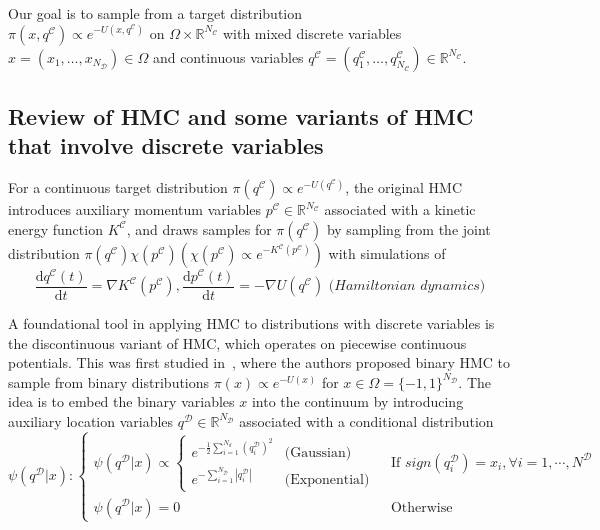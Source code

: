 \documentclass{article}
\newcommand{\cald}{\mathcal{D}}
\newcommand{\calc}{\mathcal{C}}
\begin{document}
Our goal is to sample from a target distribution $\pi (x, q^\calc)\propto e^{-U(x, q^\calc)}\text{ on }\Omega\times \mathbb{R}^{N_\calc}$ with mixed discrete variables $x = (x_1, \ldots, x_{N_\cald})\in\Omega$ and continuous variables $q^\calc=(q^\calc_1, \ldots, q^\calc_{N_\calc})\in\mathbb{R}^{N_\calc}$. 

\subsection{Review of HMC and some variants of HMC that involve discrete variables}\label{sec:related_works}

For a continuous target distribution $\pi(q^\calc)\propto e^{-U(q^\calc)}$, the original HMC introduces auxiliary momentum variables $p^\calc\in\mathbb{R}^{N_\calc}$ associated with a kinetic energy function $K^\calc$, and draws samples for $\pi(q^\calc)$ by sampling from the joint distribution $\pi(q^\calc)\chi(p^\calc) (\chi(p^\calc)\propto e^{-K^\calc(p^\calc)})$ with simulations of
\vspace*{-2pt}
\[\frac{\mathrm{d} q^\calc(t)}{\mathrm{d} t} = \nabla K^\calc(p^\calc), \frac{\mathrm{d} p^\calc(t)}{\mathrm{d}t} = -\nabla U(q^\calc)\textit{ (Hamiltonian dynamics)}\]

A foundational tool in applying HMC to distributions with discrete variables is the discontinuous variant of HMC, which operates on piecewise continuous potentials. This was first studied in~\cite{Pakman2013-gi}, where the authors proposed binary HMC to sample from binary distributions $\pi(x)\propto e^{-U(x)}$ for $x\in\Omega=\{-1,1\}^{N_\cald}$. The idea is to embed the binary variables $x$ into the continuum by introducing auxiliary location variables $q^\cald\in\mathbb{R}^{N_\cald}$ associated with a conditional distribution
\[
    \psi(q^\cald | x) : \begin{cases}
        \psi(q^\cald | x) \propto 
        \begin{cases}
            e^{-\frac{1}{2}\sum_{i=1}^{N_d}(q^\cald_i)^2}&\text{(Gaussian)}\\
            e^{-\sum_{i=1}^{N_\cald}|q^\cald_i|}&\text{(Exponential)}
        \end{cases} & \text{ If }sign(q^\cald_i) = x_i, \forall i=1, \cdots, N^\cald\\
        \psi(q^\cald | x) = 0 & \text{ Otherwise}
    \end{cases}
\]
\end{document}
